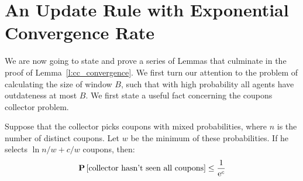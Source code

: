\section{An Update Rule with Exponential Convergence Rate}\label{app:s:cc_convergence}
We are now going to state and prove a series of Lemmas that culminate in
the proof of Lemma~\ref{l:cc_convergence}. We first turn our attention to
the problem of calculating the size of window $B$, such that with high probability
all agents have outdateness at most $B$.
We first state a useful fact concerning the coupons collector problem.

\begin{lemma}\label{l:coupons_lemma}
Suppose that the collector picks coupons with mixed
probabilities, where $n$ is the number of distinct coupons.
Let $w$ be the minimum of these probabilities.
If he selects $\ln n/w+ c/w$ coupons, then:
$$
\bm{\mathrm{P}}\left[\text{collector hasn't seen all coupons}\right] \leq \frac{1}{\mathrm{e}^c}
$$
\end{lemma}

